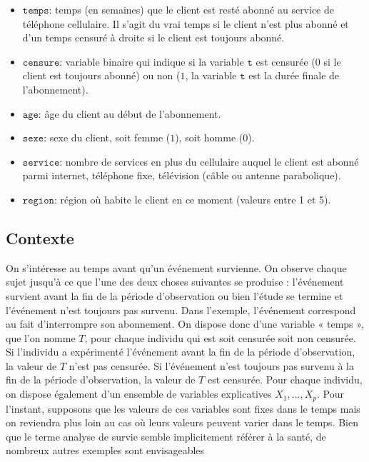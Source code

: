 \documentclass[
  11pt,
  letterpaper,
]{scrbook}
\providecommand{\tightlist}{%
  \setlength{\itemsep}{0pt}\setlength{\parskip}{0pt}}\usepackage{longtable,booktabs,array}
\theoremstyle{definition}
\theoremstyle{remark}
\begin{document}
\begin{itemize}
\tightlist
\item
  \(\texttt{temps}\): temps (en semaines) que le client est resté abonné
  au service de téléphone cellulaire. Il s'agit du vrai temps si le
  client n'est plus abonné et d'un temps censuré à droite si le client
  est toujours abonné.
\item
  \(\texttt{censure}\): variable binaire qui indique si la variable
  \(\texttt{t}\) est censurée (\(0\) si le client est toujours abonné)
  ou non (\(1\), la variable \(\texttt{t}\) est la durée finale de
  l'abonnement).
\item
  \(\texttt{age}\): âge du client au début de l'abonnement.
\item
  \(\texttt{sexe}\): sexe du client, soit femme (\(1\)), soit homme
  (\(0\)).
\item
  \(\texttt{service}\): nombre de services en plus du cellulaire auquel
  le client est abonné parmi internet, téléphone fixe, télévision (câble
  ou antenne parabolique).
\item
  \(\texttt{region}\): région où habite le client en ce moment (valeurs
  entre 1 et 5).
\end{itemize}

\subsection{Contexte}\label{contexte}

On s'intéresse au temps avant qu'un événement survienne. On observe
chaque sujet jusqu'à ce que l'une des deux choses suivantes se produise
: l'événement survient avant la fin de la période d'observation ou bien
l'étude se termine et l'événement n'est toujours pas survenu. Dans
l'exemple, l'événement correspond au fait d'interrompre son abonnement.
On dispose donc d'une variable « temps », que l'on nomme \(T\), pour
chaque individu qui est soit censurée soit non censurée. Si l'individu a
expérimenté l'événement avant la fin de la période d'observation, la
valeur de \(T\) n'est pas censurée. Si l'événement n'est toujours pas
survenu à la fin de la période d'observation, la valeur de \(T\) est
censurée. Pour chaque individu, on dispose également d'un ensemble de
variables explicatives \(X_1, \ldots, X_p\). Pour l'instant, supposons
que les valeurs de ces variables sont fixes dans le temps mais on
reviendra plus loin au cas où leurs valeurs peuvent varier dans le
temps. Bien que le terme analyse de survie semble implicitement référer
à la santé, de nombreux autres exemples sont envisageables
\end{document}
